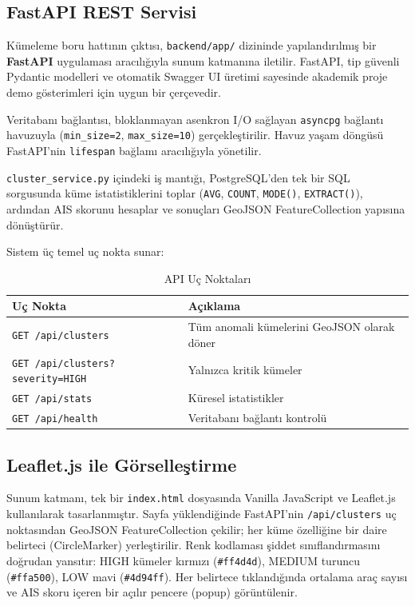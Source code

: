\documentclass[12pt,a4paper]{article}
\begin{document}
\subsection{FastAPI REST Servisi}

Kümeleme boru hattının çıktısı, \texttt{backend/app/} dizininde yapılandırılmış bir \textbf{FastAPI} uygulaması aracılığıyla sunum katmanına iletilir. FastAPI, tip güvenli Pydantic modelleri ve otomatik Swagger UI üretimi sayesinde akademik proje demo gösterimleri için uygun bir çerçevedir.

Veritabanı bağlantısı, bloklanmayan asenkron I/O sağlayan \texttt{asyncpg} bağlantı havuzuyla (\texttt{min\_size=2}, \texttt{max\_size=10}) gerçekleştirilir. Havuz yaşam döngüsü FastAPI'nin \texttt{lifespan} bağlamı aracılığıyla yönetilir.

\texttt{cluster\_service.py} içindeki iş mantığı, PostgreSQL'den tek bir SQL sorgusunda küme istatistiklerini toplar (\texttt{AVG}, \texttt{COUNT}, \texttt{MODE()}, \texttt{EXTRACT()}), ardından AIS skorunu hesaplar ve sonuçları GeoJSON FeatureCollection yapısına dönüştürür.

Sistem üç temel uç nokta sunar:

\begin{table}[H]
\centering
\caption{API Uç Noktaları}
\label{tab:api-endpoints}
\begin{tabular}{l l}
\toprule
\textbf{Uç Nokta} & \textbf{Açıklama} \\
\midrule
\texttt{GET /api/clusters}              & Tüm anomali kümelerini GeoJSON olarak döner \\
\texttt{GET /api/clusters?severity=HIGH} & Yalnızca kritik kümeler \\
\texttt{GET /api/stats}                  & Küresel istatistikler \\
\texttt{GET /api/health}                 & Veritabanı bağlantı kontrolü \\
\bottomrule
\end{tabular}
\end{table}

\subsection{Leaflet.js ile Görselleştirme}

Sunum katmanı, tek bir \texttt{index.html} dosyasında Vanilla JavaScript ve Leaflet.js kullanılarak tasarlanmıştır. Sayfa yüklendiğinde FastAPI'nin \texttt{/api/clusters} uç noktasından GeoJSON FeatureCollection çekilir; her küme özelliğine bir daire belirteci (CircleMarker) yerleştirilir. Renk kodlaması şiddet sınıflandırmasını doğrudan yansıtır: HIGH kümeler kırmızı (\texttt{\#ff4d4d}), MEDIUM turuncu (\texttt{\#ffa500}), LOW mavi (\texttt{\#4d94ff}). Her belirtece tıklandığında ortalama araç sayısı ve AIS skoru içeren bir açılır pencere (popup) görüntülenir.
\end{document}
